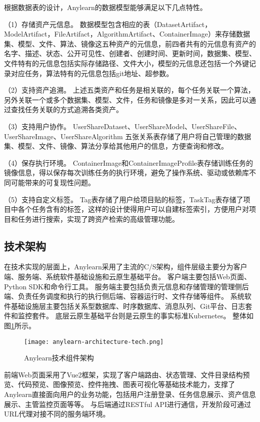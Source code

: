 根据数据表的设计，Anylearn的数据模型能够满足以下几点特性。

（1）存储资产元信息。 
数据模型包含相应的表（DatasetArtifact，ModelArtifact，FileArtifact，AlgorithmArtifact、ContainerImage）来存储数据集、模型、文件、算法、镜像这五种资产的元信息，前四者共有的元信息有资产的名字、描述、状态、公开可见性、创建者、创建时间、更新时间，数据集、模型、文件特有的元信息包括实际存储路径、文件大小，模型的元信息还包括一个外键记录对应任务，算法特有的元信息包括git地址、超参数。

（2）支持资产追溯。
上述五类资产和任务是相关联的，每个任务关联一个算法，另外关联一个或多个数据集、模型、文件，任务和镜像是多对一关系，因此可以通过查找任务关联的方式追溯各类资产。

（3）支持用户协作。
UserShareDataset、UserShareModel、UserShareFile、UserShareImage、UserShareAlgorithm 五张关系表存储了用户将自己管理的数据集、模型、文件、镜像、算法分享给其他用户的信息，方便查询和修改。

（4）保存执行环境。
ContainerImage和ContainerImageProfile表存储训练任务的镜像信息，得以保存每次训练任务的执行环境，避免了操作系统、驱动或依赖库不同可能带来的可复现性问题。

（5）支持自定义标签。
Tag表存储了用户给项目贴的标签，TaskTag表存储了项目中各个任务含有的标签，这样的设计使得用户可以自建标签索引，方便用户对项目和任务进行搜索，实现了跨资产检索的高级管理功能。

\subsection{技术架构}

在技术实现的层面上，Anylearn采用了主流的C/S架构，组件层级主要分为客户端、服务端、系统软件基础设施和云原生基础平台。
客户端主要包括Web页面、Python SDK和命令行工具。
服务端主要包括负责元信息和存储管理的管理侧后端、负责任务调度和执行的执行侧后端、容器运行时、文件存储等组件。
系统软件基础设施层主要包括关系型数据库、时序数据库、消息队列、Git平台、日志套件和监控套件。
底层云原生基础平台则是云原生的事实标准Kubernetes。
整体如图\ref{fig:anylearntech}所示。

\begin{figure}
  \centering
  \texttt{[image: anylearn-architecture-tech.png]}
  \caption{Anylearn技术组件架构}
  \label{fig:anylearntech}
\end{figure}

前端Web页面采用了Vue2框架，实现了客户端路由、状态管理、文件目录结构预览、代码预览、图像预览、控件拖拽、图表可视化等基础技术能力，支撑了Anylearn直接面向用户的业务功能，包括用户注册登录、任务信息展示、资产信息展示、主管监控页面等等。
与后端通过RESTful API进行通信，开发阶段可通过URL代理对接不同的服务端环境。

